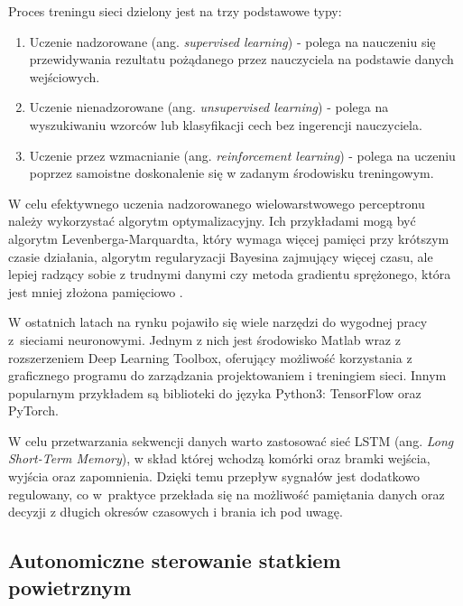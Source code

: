 \documentclass[12pt, a4paper]{article}
\begin{document}
Proces treningu sieci dzielony jest na trzy podstawowe typy: 

\begin{enumerate}
	\item Uczenie nadzorowane (ang. \textit{supervised learning}) - polega na nauczeniu się przewidywania rezultatu pożądanego przez nauczyciela na podstawie danych wejściowych.
	\item Uczenie nienadzorowane (ang. \textit{unsupervised learning}) - polega na wyszukiwaniu wzorców lub klasyfikacji cech bez ingerencji nauczyciela.
	\item Uczenie przez wzmacnianie (ang. \textit{reinforcement learning}) - polega na uczeniu poprzez samoistne doskonalenie się w zadanym środowisku treningowym.
\end{enumerate}

W celu efektywnego uczenia nadzorowanego wielowarstwowego perceptronu należy wykorzystać algorytm optymalizacyjny. Ich przykładami mogą być algorytm Levenberga-Marquardta, który wymaga więcej pamięci przy krótszym czasie działania, algorytm regularyzacji Bayesina zajmujący więcej czasu, ale lepiej radzący sobie z trudnymi danymi czy metoda gradientu sprężonego, która jest mniej złożona pamięciowo \cite{mat}.

W ostatnich latach na rynku pojawiło się wiele narzędzi do wygodnej pracy z~sieciami neuronowymi. Jednym z nich jest środowisko Matlab wraz z rozszerzeniem Deep Learning Toolbox, oferujący możliwość korzystania z graficznego programu do zarządzania projektowaniem i treningiem sieci. Innym popularnym przykładem są biblioteki do języka Python3: TensorFlow oraz PyTorch.

W celu przetwarzania sekwencji danych warto zastosować sieć LSTM (ang. \textit{Long Short-Term Memory}), w skład której wchodzą komórki oraz bramki wejścia, wyjścia oraz zapomnienia. Dzięki temu przepływ sygnałów jest dodatkowo regulowany, co w~praktyce przekłada się na możliwość pamiętania danych oraz decyzji z długich okresów czasowych i brania ich pod uwagę. 

\subsection{Autonomiczne sterowanie statkiem powietrznym}
\end{document}
